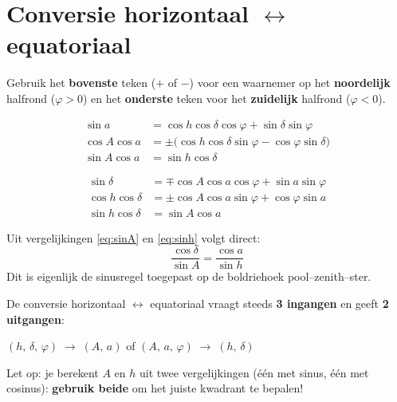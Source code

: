 \documentclass[11pt, a4paper]{article}
\begin{document}
\section{Conversie horizontaal $\leftrightarrow$ equatoriaal}

\begin{opgelet}
Gebruik het \textbf{bovenste} teken ($+$ of $-$) voor een waarnemer op het \textbf{noordelijk} halfrond ($\varphi > 0$) en het \textbf{onderste} teken voor het \textbf{zuidelijk} halfrond ($\varphi < 0$).
\end{opgelet}

\begin{formule}
\begin{align}
  \sin a &= \cos h\cos\delta\cos\varphi + \sin\delta\sin\varphi \label{eq:sina} \\
  \cos A\cos a &= \pm\bigl(\cos h\cos\delta\sin\varphi - \cos\varphi\sin\delta\bigr) \label{eq:cosA} \\
  \sin A\cos a &= \sin h\cos\delta \label{eq:sinA}
\end{align}
\end{formule}

\begin{formule}
\begin{align}
  \sin\delta &= \mp\cos A\cos a\cos\varphi + \sin a\sin\varphi \label{eq:sindelta} \\
  \cos h\cos\delta &= \pm\cos A\cos a\sin\varphi + \cos\varphi\sin a \label{eq:cosh} \\
  \sin h\cos\delta &= \sin A\cos a \label{eq:sinh}
\end{align}
\end{formule}

\begin{weetje}
Uit vergelijkingen \eqref{eq:sinA} en \eqref{eq:sinh} volgt direct:
\[
  \frac{\cos\delta}{\sin A} = \frac{\cos a}{\sin h}
\]
Dit is eigenlijk de sinusregel toegepast op de boldriehoek pool–zenith–ster.
\end{weetje}

\begin{tip}
De conversie horizontaal $\leftrightarrow$ equatoriaal vraagt steeds \textbf{3 ingangen} en geeft \textbf{2 uitgangen}:
\begin{center}
  $(h,\,\delta,\,\varphi) \;\longrightarrow\; (A,\,a)$
  \qquad of \qquad
  $(A,\,a,\,\varphi) \;\longrightarrow\; (h,\,\delta)$
\end{center}
Let op: je berekent $A$ en $h$ uit twee vergelijkingen (één met sinus, één met cosinus): \textbf{gebruik beide} om het juiste kwadrant te bepalen!
\end{tip}
\end{document}

